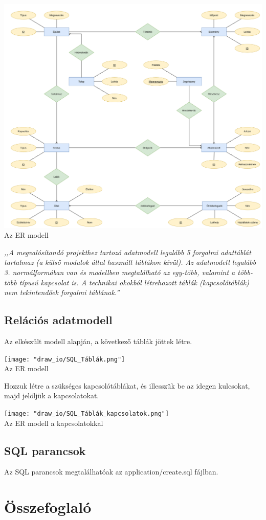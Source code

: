 \documentclass[a4paper,12pt]{article}
\begin{document}
\begin{center}
	\includegraphics[width = 17cm]{"draw_io/SQL_tervezés.png"} \\
	{\small Az ER modell}
\end{center}

\begin{center}
	\textit{{\small ,,A megvalósítandó projekthez tartozó adatmodell legalább 5 forgalmi adattáblát tartalmaz (a külső modulok által használt táblákon kívül). Az adatmodell legalább 3. normálformában van és modellben megtalálható az egy-több, valamint a több-több típusú kapcsolat is. A technikai okokból létrehozott táblák (kapcsolótáblák) nem tekintendőek forgalmi táblának.''}}
\end{center}
\newpage
\subsection{Relációs adatmodell}
Az elkészült modell alapján, a következő táblák jöttek létre.
\begin{center}
	\texttt{[image: "draw\_io/SQL\_Táblák.png"]} \\
	{\small Az ER modell}
\end{center}
Hozzuk létre a szükséges kapcsolótáblákat, és illesszük be az idegen kulcsokat, majd jelöljük a kapcsolatokat.

\begin{center}
	\texttt{[image: "draw\_io/SQL\_Táblák\_kapcsolatok.png"]} \\
	{\small Az ER modell a kapcsolatokkal}
\end{center}
\subsection{SQL parancsok}
Az SQL parancsok megtalálhatóak az application/create.sql fájlban.
\section{Összefoglaló}
\end{document}
